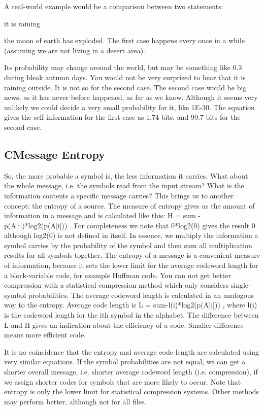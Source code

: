 \begin{frame}
A real-world example would be a comparison between two statements:

\item it is raining
\item the moon of earth has exploded.
The first case happens every once in a while (assuming we are not living in a desert area). 

Its probability may change around the world, but may be something like 0.3 during bleak autumn days. 
You would not be very surprised to hear that it is raining outside. 
It is not so for the second case. The second case would be big news, as it has never before happened, as far 
as we know. Although it seems very unlikely we could decide a very small probability for it, like 1E-30. 
The equation gives the self-information for the first case as 1.74 bits, and 99.7 bits for the second case.

\end{frame}
\begin{frame}

\subsection*{CMessage Entropy}


So, the more probable a symbol is, the less information it carries. What about the whole message, i.e. the symbols read from the input stream? What is the information contents a specific message carries? This brings us to another concept: the entropy of a source. The measure of entropy gives us the amount of information in a message and is calculated like this: H = sum{ -p(A[i])*log2(p(A[i])) }. For completeness we note that 0*log2(0) gives the result 0 although log2(0) is not defined in itself. In essence, we multiply the information a symbol carries by the probability of the symbol and then sum all multiplication results for all symbols together.
The entropy of a message is a convenient measure of information, because it sets the lower limit for the average codeword length for a block-variable code, for example Huffman code. You can not get better compression with a statistical compression method which only considers single-symbol probabilities. The average codeword length is calculated in an analogous way to the entropy. Average code length is L = sum{-l(i)*log2(p(A[i])) }, where l(i) is the codeword length for the ith symbol in the alphabet. The difference between L and H gives an indication about the efficiency of a code. Smaller difference means more efficient code.

It is no coincidence that the entropy and average code length are calculated using very similar equations. If the symbol probabilities are not equal, we can get a shorter overall message, i.e. shorter average codeword length (i.e. compression), if we assign shorter codes for symbols that are more likely to occur. Note that entropy is only the lower limit for statistical compression systems. Other methods may perform better, although not for all files.
\end{frame}
